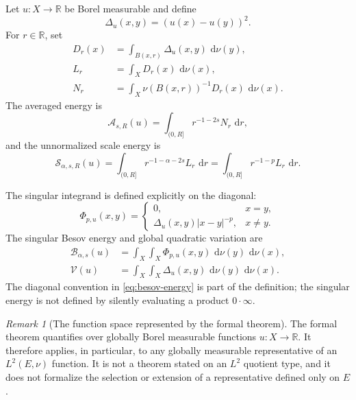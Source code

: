 \documentclass[11pt]{article}
\theoremstyle{remark}
\newtheorem{remark}[theorem]{Remark}
\newcommand{\dd}{\,\mathrm{d}}
\newcommand{\Aenergy}{\mathcal A}
\newcommand{\Senergy}{\mathcal S}
\newcommand{\Benergy}{\mathcal B}
\newcommand{\Venergy}{\mathcal V}
\begin{document}
Let \(u:X\to\mathbb R\) be Borel measurable and define
\[
  \Delta_u(x,y)=(u(x)-u(y))^2.
\]
For \(r\in\mathbb R\), set
\begin{align}
  D_r(x)
  &=
  \int_{B(x,r)}\Delta_u(x,y)\,\dd\nu(y),                                      \label{eq:ball-energy}\\
  L_r
  &=
  \int_XD_r(x)\,\dd\nu(x),                                                     \label{eq:local-energy}\\
  N_r
  &=
  \int_X\nu(B(x,r))^{-1}D_r(x)\,\dd\nu(x).                                    \label{eq:normalized-local-energy}
\end{align}
The averaged energy is
\begin{equation}
  \Aenergy_{s,R}(u)
  =
  \int_{(0,R]}r^{-1-2s}N_r\,\dd r,                                             \label{eq:averaged-energy}
\end{equation}
and the unnormalized scale energy is
\begin{equation}
  \Senergy_{\alpha,s,R}(u)
  =
  \int_{(0,R]}r^{-1-\alpha-2s}L_r\,\dd r
  =
  \int_{(0,R]}r^{-1-p}L_r\,\dd r.                                              \label{eq:scale-energy}
\end{equation}

The singular integrand is defined explicitly on the diagonal:
\[
  \Phi_{p,u}(x,y)
  =
  \begin{cases}
    0,&x=y,\\
    \Delta_u(x,y)\lvert x-y\rvert^{-p},&x\neq y.
  \end{cases}
\]
The singular Besov energy and global quadratic variation are
\begin{align}
  \Benergy_{\alpha,s}(u)
  &=
  \int_X\int_X\Phi_{p,u}(x,y)\,\dd\nu(y)\,\dd\nu(x),                            \label{eq:besov-energy}\\
  \Venergy(u)
  &=
  \int_X\int_X\Delta_u(x,y)\,\dd\nu(y)\,\dd\nu(x).                             \label{eq:global-variation}
\end{align}
The diagonal convention in \eqref{eq:besov-energy} is part of the
definition; the singular energy is not defined by silently evaluating a
product \(0\cdot\infty\).

\begin{remark}[The function space represented by the formal theorem]
The formal theorem quantifies over globally Borel measurable functions
\(u:X\to\mathbb R\).  It therefore applies, in particular, to any globally
measurable representative of an \(L^2(E,\nu)\) function.  It is not a
theorem stated on an \(L^2\) quotient type, and it does not formalize the
selection or extension of a representative defined only on \(E\).
\end{remark}
\end{document}
